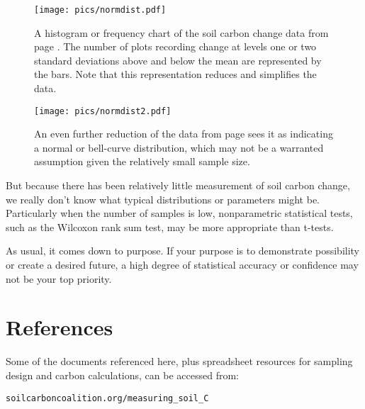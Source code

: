 \documentclass[11pt,letterpaper,oneside,onecolumn]{memoir}
\begin{document}
\begin{figure}
\centering
\texttt{[image: pics/normdist.pdf]}
\caption{A histogram or frequency chart of the soil carbon change data from page \pageref{bar6}. The number of plots recording change at levels one or two standard deviations above and below the mean are represented by the bars. Note that this representation reduces and simplifies the data.}
\end{figure}

\begin{figure}
\centering
\texttt{[image: pics/normdist2.pdf]}
\caption{An even further reduction of the data from page \pageref{bar6} sees it as indicating a normal or bell-curve distribution, which may not be a warranted assumption given the relatively small sample size.}
\end{figure}

But because there has been relatively little measurement of soil carbon change, we really don't know what typical distributions or parameters might be. Particularly when the number of samples is low, nonparametric statistical tests, such as the Wilcoxon rank sum test, may be more appropriate than t-tests.

As usual, it comes down to purpose. If your purpose is to demonstrate possibility or create a desired future, a high degree of statistical accuracy or confidence may not be your top priority.

\chapter{References}

Some of the documents referenced here, plus spreadsheet resources for sampling design and carbon calculations, can be accessed from:

\texttt{soilcarboncoalition.org/measuring\_soil\_C}
\end{document}
